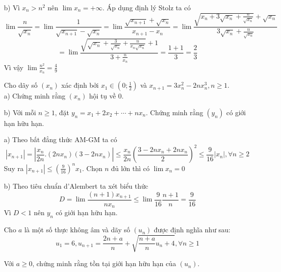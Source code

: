 \documentclass[11pt]{scrartcl}
\begin{document}
\begin{itemize}[label=, leftmargin=0em, itemsep=0.5em]
\begin{sol}
        b) Vì $x_n > n^2$ nên $\lim x_n = +\infty$. Áp dụng định lý Stolz ta có 
        \[\lim \frac{n}{\sqrt{x_n}} =\lim \frac{1}{\sqrt{x_{n + 1}} - \sqrt{x_n}} = \lim \frac{\sqrt{x_{n+1}} + \sqrt{x_n}}{x_{n + 1} - x_n} = \lim \frac{\sqrt{x_n + 3\sqrt{x_n} + \frac{n}{\sqrt{x_n}}}+ \sqrt{x_n}}{3\sqrt{x_n} + \frac{n}{\sqrt{x_n}}} \]
        \[
            = \lim \frac{\sqrt{\sqrt{x_n} + \frac{3}{\sqrt{x_n}} + \frac{n}{x_n\sqrt{x_n}}}+ 1}{3 + \frac{n}{x_n}} = \frac{1 + 1}{3} = \frac{2}{3}
        \]
        Vì vậy $\lim\frac{n^2}{x_n} = \frac{4}{9}$
    \end{sol}

    \begin{bt}
        Cho dãy số $(x_n)$ xác định bởi $x_1\in (0;\frac{1}{2})$ và $x_{n+1}=3x_n^2-2nx_n^3, n\geq 1$.\\
        a) Chứng minh rằng $(x_n)$ hội tụ về $0$.

        
        b) Với mỗi $n\ge 1$, đặt $y_n=x_1+2x_2+\cdots+n x_n$. Chứng minh rằng $(y_n)$ có giới hạn hữu hạn.
    \end{bt}

    \begin{sol}
        a) Theo bất đẳng thức AM-GM ta có $$|x_{n + 1 }| = |\frac{x_n}{2n}.(2nx_n)\left(3 - 2nx_n\right)| \leq \frac{x_n}{2n}\left(\frac{3 - 2nx_n + 2nx_n}{2}\right)^2 \leq \frac{9}{16}|x_n|, \forall n\geq 2 $$
        Suy ra $|x_{n + 1}| \leq \left(\frac{9}{16}\right)^n x_1$. Chọn $n$ đủ lớn thì có $\lim x_n = 0$


        b) Theo tiêu chuẩn d'Alembert ta xét biểu thức 
        \[D =\lim\frac{(n + 1)x_{n+1}}{nx_n} \leq \lim \frac{9}{16}\frac{n + 1}{n} = \frac{9}{16}\]
        Vì $D < 1$ nên $y_n$ có giới hạn hữu hạn.
    \end{sol}
    \begin{bt}
        Cho $a$ là một số thực không âm và dãy số $(u_n)$ được định nghĩa như sau:
$$u_1=6, u_{n+1} = \frac{2n+a}{n} + \sqrt{\frac{n+a}{n}u_n+4}, \forall n \ge 1$$

Với $a \ge 0$, chứng minh rằng tồn tại giới hạn hữu hạn của $(u_n)$.
    \end{bt}


\end{itemize}
\end{document}
